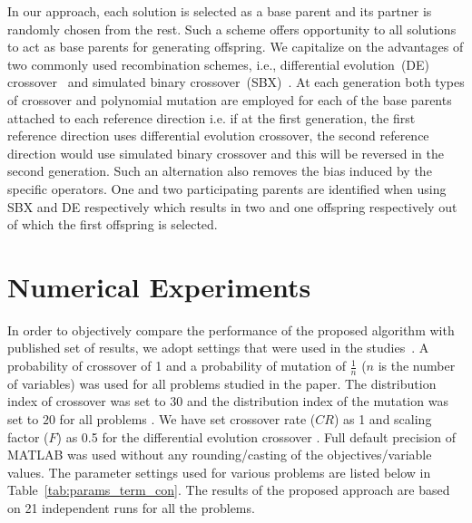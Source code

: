 \documentclass{sig-alternate}
\begin{document}
\begin{itemize}
	In our approach, each solution is selected as a base parent and its partner is randomly chosen from the rest. Such a scheme offers opportunity to all solutions to act as base parents for generating offspring. We capitalize on the advantages of two commonly used recombination schemes, i.e., differential evolution~(DE) crossover~\cite{das2011de} and simulated binary crossover~(SBX)~\cite{deb2002fast}. At each generation both types of crossover and polynomial mutation are employed for each of the base parents attached to each reference direction i.e. if at the first generation, the first reference direction uses differential evolution crossover, the second reference direction  would use simulated binary crossover and this will be reversed in the second generation. Such an alternation also removes the bias induced by the specific operators. One and two participating parents are identified when using SBX and DE respectively which results in two and one offspring respectively out of which the first offspring is selected.       
	
\end{itemize}

\section{Numerical Experiments}
\label{sec:expset}

In order to objectively compare the performance of the proposed algorithm with published set of results, we adopt settings that were used in the studies~\cite{Deb2014adaptive,ishibuchi2016inverse}. A probability of crossover of 1 and a probability of mutation of $\frac{1}{n}$ ($n$ is the number of variables) \cite{Deb2014adaptive} was used for all problems studied in the paper. The distribution index of crossover was set to $30$ and the distribution index of the mutation was set to $20$ for all problems \cite{Deb2014adaptive}. We have set crossover rate ($CR$) as 1 and scaling factor ($F$) as 0.5 for the differential evolution crossover \cite{das2011de}. Full default precision of MATLAB was used without any rounding/casting of the objectives/variable values. The parameter settings used for various problems are listed below in Table~\ref{tab:params_term_con}. The results of the proposed approach are based on 21 independent runs for all the problems.  
\end{document}
